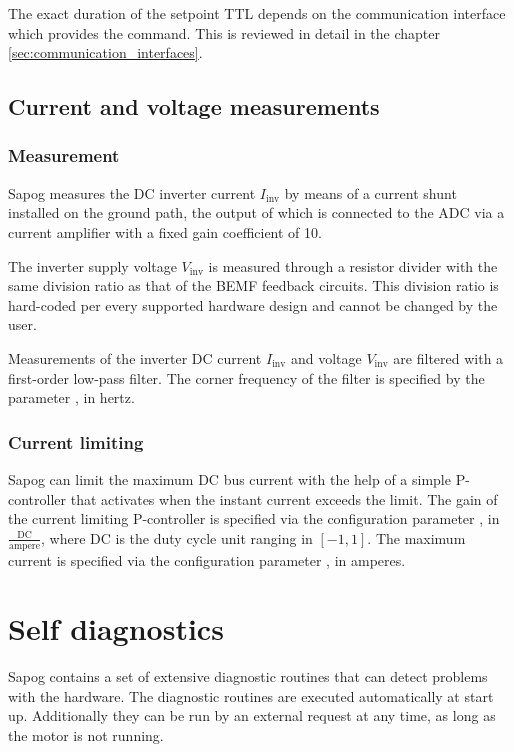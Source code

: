 \documentclass{zubaxdoc}
\begin{document}
The exact duration of the setpoint TTL depends on the communication interface which provides the command.
This is reviewed in detail in the chapter \ref{sec:communication_interfaces}.

\subsection{Current and voltage measurements}

\subsubsection{Measurement}

Sapog measures the DC inverter current $I_\text{inv}$ by means of a current shunt installed on the ground path,
the output of which is connected to the ADC via a current amplifier with a fixed gain coefficient of 10.

The inverter supply voltage $V_\text{inv}$ is measured through a resistor divider with the same
division ratio as that of the BEMF feedback circuits.
This division ratio is hard-coded per every supported hardware design and cannot be changed by the user.

Measurements of the inverter DC current $I_\text{inv}$ and voltage $V_\text{inv}$
are filtered with a first-order low-pass filter.
The corner frequency of the filter is specified by the parameter , in hertz.

\subsubsection{Current limiting}\label{sec:current_limiting}

Sapog can limit the maximum DC bus current with the help of a simple P-controller
that activates when the instant current exceeds the limit.
The gain of the current limiting P-controller is specified via the configuration parameter
, in $\frac{\text{DC}}{\text{ampere}}$, where $\text{DC}$ is the duty cycle unit
ranging in $\left[-1, 1\right]$.
The maximum current is specified via the configuration parameter , in amperes.

\section{Self diagnostics}\label{sec:self_diagnostics}

Sapog contains a set of extensive diagnostic routines that can detect problems with the hardware.
The diagnostic routines are executed automatically at start up.
Additionally they can be run by an external request at any time, as long as the motor is not running.
\end{document}
